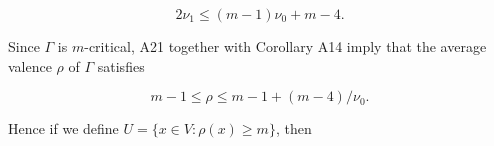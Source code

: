 $$2\nu_1 \leq (m - 1)\nu_0 + m - 4.$$

Since $\Gamma$ is $m$-critical, A21 together with Corollary A14 imply that the average valence $\rho$ of $\Gamma$ satisfies

$$m - 1 \leq \rho \leq m - 1 + (m - 4)/\nu_0.$$

Hence if we define $U = \{x \in V : \rho(x) \geq m\}$, then
